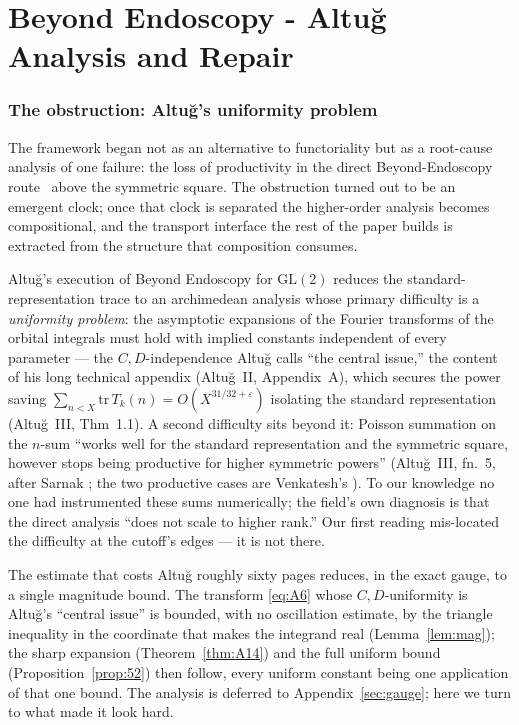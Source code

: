 \documentclass[11pt]{article}
\theoremstyle{definition}
\begin{document}
\part{Beyond Endoscopy - Altu\u{g} Analysis and Repair}

\section{The obstruction: Altu\u{g}'s uniformity problem}\label{sec:two}

The framework began not as an alternative to functoriality but as a root-cause analysis of one
failure: the loss of productivity in the direct Beyond-Endoscopy route~\cite{Langlands} above the
symmetric square.
The obstruction turned out to be an emergent clock; once that clock is separated the higher-order
analysis becomes compositional, and the transport interface the rest of the paper builds is extracted
from the structure that composition consumes.

Altu\u{g}'s execution of Beyond Endoscopy for $\mathrm{GL}(2)$ \cite{AltI,AltII,AltIII} reduces the
standard-representation trace to an archimedean analysis whose primary difficulty is a \emph{uniformity
problem}: the asymptotic expansions of the Fourier transforms of the orbital integrals must hold with
implied constants independent of every parameter --- the $C,D$-independence Altu\u{g} calls ``the
central issue,'' the content of his long technical appendix (Altu\u{g}~II, Appendix~A), which secures
the power saving $\sum_{n<X}\mathrm{tr}\,T_k(n)=O(X^{31/32+\varepsilon})$ isolating the standard
representation (Altu\u{g}~III, Thm~1.1). A second difficulty sits beyond it: Poisson summation on the
$n$-sum ``works well for the standard representation and the symmetric square, however stops being
productive for higher symmetric powers'' (Altu\u{g}~III, fn.~5, after Sarnak \cite{Sar}; the two
productive cases are Venkatesh's \cite{Venkatesh}). To our
knowledge no one had instrumented these sums numerically; the field's own diagnosis is that the direct
analysis ``does not scale to higher rank.'' Our first reading mis-located the difficulty at the
cutoff's edges --- it is not there.

\medskip
\noindent The estimate that costs Altu\u{g} roughly sixty pages reduces, in the exact gauge, to a
single magnitude bound. The transform \eqref{eq:A6} whose $C,D$-uniformity is Altu\u{g}'s ``central
issue'' is bounded, with no oscillation estimate, by the triangle inequality in the coordinate that
makes the integrand real (Lemma~\ref{lem:mag}); the sharp expansion (Theorem~\ref{thm:A14}) and the
full uniform bound (Proposition~\ref{prop:52}) then follow, every uniform constant being one
application of that one bound. The analysis is deferred to Appendix~\ref{sec:gauge}; here we turn to
what made it look hard.
\end{document}
